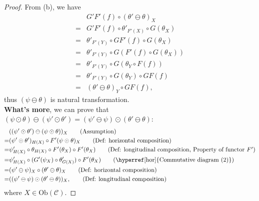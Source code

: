 \documentclass{article}
\begin{document}
\begin{proof}
		From (b), we have
		\begin{align}
			 & G'F'(f)\circ(\theta'\ominus\theta)_X\tag{Assumption}\\
			=& G'F'(f)\circ\theta'_{F'(X)}\circ G(\theta_X)\tag{Def: horizontal composition}\\
			=& \theta'_{F'(Y)}\circ GF'(f)\circ G(\theta_X)\tag{Property of natural transformation $\theta'$}\\
			=& \theta'_{F'(Y)}\circ G(F'(f)\circ G(\theta_X))\tag{Property of functor $G$}\\
			=& \theta'_{F'(Y)}\circ G(\theta_Y\circ F(f))\tag{Property of natural transformation $\theta$}\\
			=& \theta'_{F'(Y)}\circ G(\theta_Y)\circ GF(f)\tag{Property of functor $G$}\\
			=& (\theta'\ominus\theta)_Y\circ GF(f)\tag{Def: horizontal composition},
		\end{align}
		thus $(\psi\ominus\theta)$ is natural transformation.\\
		
		{\bf What's more}, we can prove that $(\psi\odot\theta)\ominus(\psi'\odot\theta')=(\psi'\ominus\psi)\odot(\theta'\ominus\theta)$:
		\begin{align}
			 & ((\psi'\odot\theta')\ominus(\psi\odot\theta))_X\tag{Assumption}\\
			=& (\psi'\odot\theta')_{H(X)}\circ F'(\psi\odot\theta)_X\tag{Def: horizontal composition}\\
			=& \psi'_{H(X)}\circ\theta_{H(X)}\circ F'(\theta_X)\circ F'(\theta_X)\tag{Def: longitudinal composition, Property of functor $F'$}\\
			=& \psi'_{H(X)}\circ(G'(\psi_X)\circ \theta'_{G(X)})\circ F'(\theta_X)\tag{\hyperref[hor]{Commutative diagram (2)}}\\
			=& (\psi'\ominus\psi)_X\circ(\theta'\ominus\theta)_X\tag{Def: horizontal composition}\\
			=& ((\psi'\ominus\psi)\odot(\theta'\ominus\theta))_X,\tag{Def: longitudinal composition}
		\end{align}
		where $X\in\mathrm{Ob}(\mathcal{C})$.
\end{proof}
\end{document}
